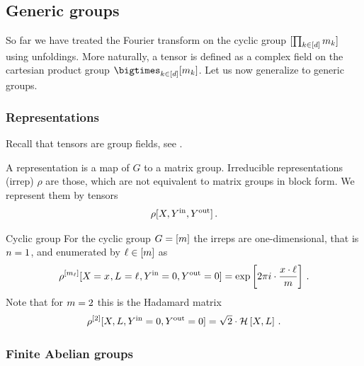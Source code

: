 \subsection{Generic groups}

So far we have treated the Fourier transform on the cyclic group $[\prod_{k\in[d]}m_{k}]$ using unfoldings.
More naturally, a tensor is defined as a complex field on the cartesian product group $\facstates$.
Let us now generalize to generic groups.



\subsubsection{Representations}

Recall that tensors are group fields, see .

A representation is a map of $G$ to a matrix group.
Irreducible representations (irrep) $\rho$ are those, which are not equivalent to matrix groups in block form.
We represent them by tensors
\begin{align*}
    \rho[X,Y^{\mathrm{in}},Y^{\mathrm{out}}] \, .
\end{align*}


\begin{example}{Cyclic group}\label{exa:cycGroupIrreps}
    For the cyclic group $G=[m]$ the irreps are one-dimensional, that is $n=1$, and enumerated by $\ell\in[m]$ as
    \begin{align*}
        \rho^{[m_{\ell}]}[X_{}=x_{},L_{}=\ell_{},Y^{\mathrm{in}}=0,Y^{\mathrm{out}}=0]
        = \mathrm{exp}\left[2\pi i \cdot \frac{x \cdot \ell}{m}\right] \, .
    \end{align*}
    Note that for $m=2$ this is the Hadamard matrix
    \begin{align*}
        \rho^{[2]}[X,L,Y^{\mathrm{in}}=0,Y^{\mathrm{out}}=0]
        = \sqrt{2} \cdot \mathcal{H}\left[X,L\right] \, .
    \end{align*}
\end{example}


\subsubsection{Finite Abelian groups}

